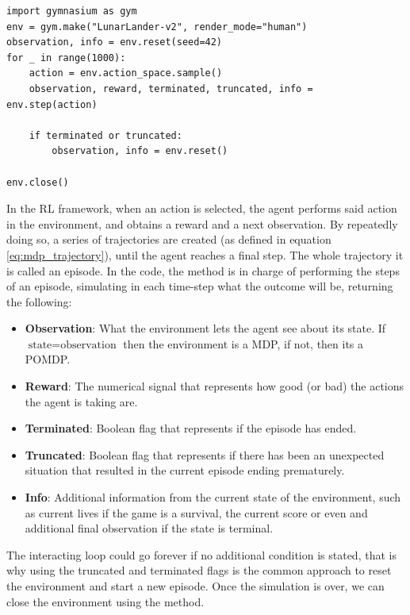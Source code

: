 \begin{lstlisting}[caption={Initialization of an environment in Farama's gymnasium}, label={code:init_env}]
import gymnasium as gym
env = gym.make("LunarLander-v2", render_mode="human")
observation, info = env.reset(seed=42)
for _ in range(1000):
	action = env.action_space.sample() 
	observation, reward, terminated, truncated, info = env.step(action)
	
	if terminated or truncated:
		observation, info = env.reset()

env.close()
\end{lstlisting}

In the RL framework, when an action is selected, the agent performs said action in the environment, and obtains a reward and a next observation. By repeatedly doing so, a series of trajectories are created (as defined in equation \ref{eq:mdp_trajectory}), until the agent reaches a final step. The whole trajectory it is called an episode. In the code, the method  is in charge of performing the steps of an episode, simulating in each time-step what the outcome will be, returning the following:

\begin{itemize}
	\item \textbf{Observation}: What the environment lets the agent see about its state. If $\text{state}=\text{observation}$ then the environment is a MDP, if not, then its a POMDP.
	\item  \textbf{Reward}: The numerical signal that represents how good (or bad) the actions the agent is taking are.
	\item \textbf{Terminated}: Boolean flag that represents if the episode has ended.
	\item  \textbf{Truncated}: Boolean flag that represents if there has been an unexpected situation that resulted in the current episode ending prematurely. 
	\item \textbf{Info}: Additional information from the current state of the environment, such as current lives if the game is a survival, the current score or even and additional final observation if the state is terminal.
\end{itemize}

The interacting loop could go forever if no additional condition is stated, that is why using the truncated and terminated flags is the common approach to reset the environment and start a new episode. Once the simulation is over, we can close the environment using the  method.

